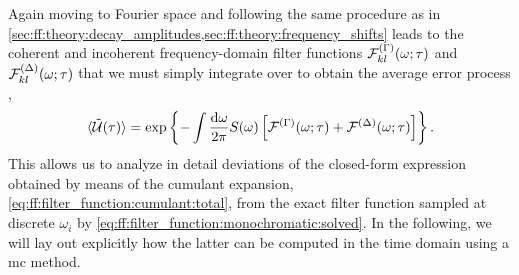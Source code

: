 Again moving to Fourier space and following the same procedure as in \cref{sec:ff:theory:decay_amplitudes,sec:ff:theory:frequency_shifts} leads to the coherent and incoherent frequency-domain filter functions $\mathcal{F}^{(\Gamma)}_{kl}(\omega;\tau)$ and $\mathcal{F}^{(\Delta)}_{kl}(\omega;\tau)$ that we must simply integrate over to obtain the average error process \liouvUetavg,
\begin{equation}\label{eq:ff:filter_function:cumulant:total}
    \liouvUetavg = \exp\left\lbrace -\int\ddf{\omega}S(\omega)\left[\FF\gth{\decayamps}(\omega;\tau) + \FF\gth{\freqshifts}(\omega;\tau)\right]\right\rbrace.
\end{equation}
This allows us to analyze in detail deviations of the closed-form expression obtained by means of the cumulant expansion, \cref{eq:ff:filter_function:cumulant:total}, from the exact filter function sampled at discrete $\omega_i$ by \cref{eq:ff:filter_function:monochromatic:solved}.
In the following, we will lay out explicitly how the latter can be computed in the time domain using a \gls{mc} method.

